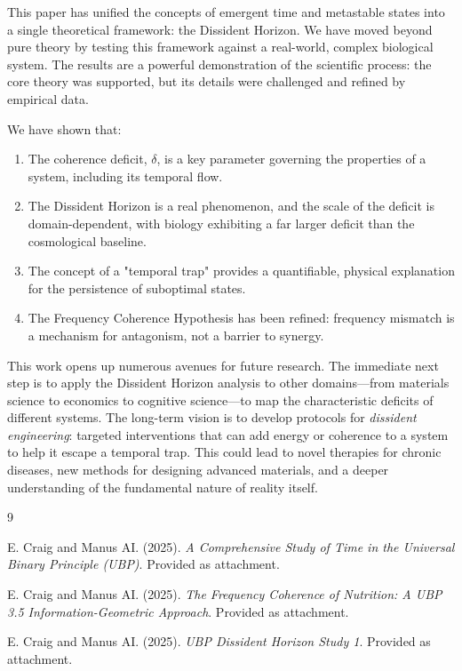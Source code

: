 \documentclass[12pt, a4paper]{article}
\begin{document}
This paper has unified the concepts of emergent time and metastable states into a single theoretical framework: the Dissident Horizon. We have moved beyond pure theory by testing this framework against a real-world, complex biological system. The results are a powerful demonstration of the scientific process: the core theory was supported, but its details were challenged and refined by empirical data.

We have shown that:
\begin{enumerate}
    \item The coherence deficit, $\delta$, is a key parameter governing the properties of a system, including its temporal flow.
    \item The Dissident Horizon is a real phenomenon, and the scale of the deficit is domain-dependent, with biology exhibiting a far larger deficit than the cosmological baseline.
    \item The concept of a "temporal trap" provides a quantifiable, physical explanation for the persistence of suboptimal states.
    \item The Frequency Coherence Hypothesis has been refined: frequency mismatch is a mechanism for antagonism, not a barrier to synergy.
\end{enumerate}

This work opens up numerous avenues for future research. The immediate next step is to apply the Dissident Horizon analysis to other domains—from materials science to economics to cognitive science—to map the characteristic deficits of different systems. The long-term vision is to develop protocols for \textit{dissident engineering}: targeted interventions that can add energy or coherence to a system to help it escape a temporal trap. This could lead to novel therapies for chronic diseases, new methods for designing advanced materials, and a deeper understanding of the fundamental nature of reality itself.

\newpage

\begin{thebibliography}{9}

E. Craig and Manus AI. (2025). \textit{A Comprehensive Study of Time in the Universal Binary Principle (UBP)}. Provided as attachment.

E. Craig and Manus AI. (2025). \textit{The Frequency Coherence of Nutrition: A UBP 3.5 Information-Geometric Approach}. Provided as attachment.

E. Craig and Manus AI. (2025). \textit{UBP Dissident Horizon Study 1}. Provided as attachment.

\end{thebibliography}
\end{document}

